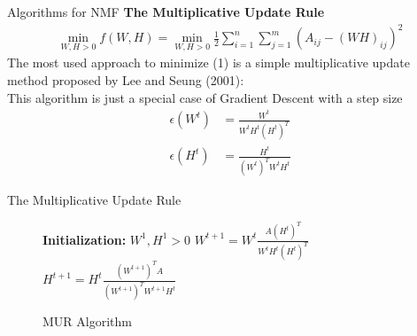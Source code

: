 \documentclass[aspectratio=169]{beamer}
\begin{document}
\begin{frame}{Algorithms for NMF}
    \textbf{The Multiplicative Update Rule}
    \begin{align}
        \min_{W,H>0}f(W,H) = \min_{W,H>0} \frac{1}{2}\sum_{i = 1}^{n}\sum_{j= 1}^{m} (A_{ij} - (WH)_{ij})^{2} \label{op}
    \end{align}
    The most used approach to minimize (1) is a simple multiplicative update method
    proposed by Lee and Seung (2001):\\
    This algorithm is just a special case of Gradient Descent with a step size 
    \begin{align*}
        \epsilon(W^{t}) &= \frac{W^{t}}{W^{t}H^{t}(H^{t})^{T}}\\
        \epsilon(H^{t}) &= \frac{H^{t}}{(W^{t})^{T}W^{t}H^{t}}
    \end{align*}
\end{frame}
\begin{frame}{The Multiplicative Update Rule}
\begin{figure}[ht]
  \centering
  \begin{minipage}{.5\linewidth}
    \begin{algorithm}[H]
    \caption{MUR Algorithm}
     \textbf{Initialization:} $W^{1}, H^{1} > 0$\;
     {
    $W^{t+1} = W^{t}\frac{A(H^{t})^{T}}{W^{t}H^{t}(H^{t})^{T}} $\;
    \vspace{0.2in}
    $H^{t+1} = H^{t}\frac{(W^{t+1})^{T}A}{(W^{t+1})^{T}W^{t+1}H^{t}}$\;}
    \end{algorithm} 
    \end{minipage}
    \end{figure}
\end{frame}
\end{document}

